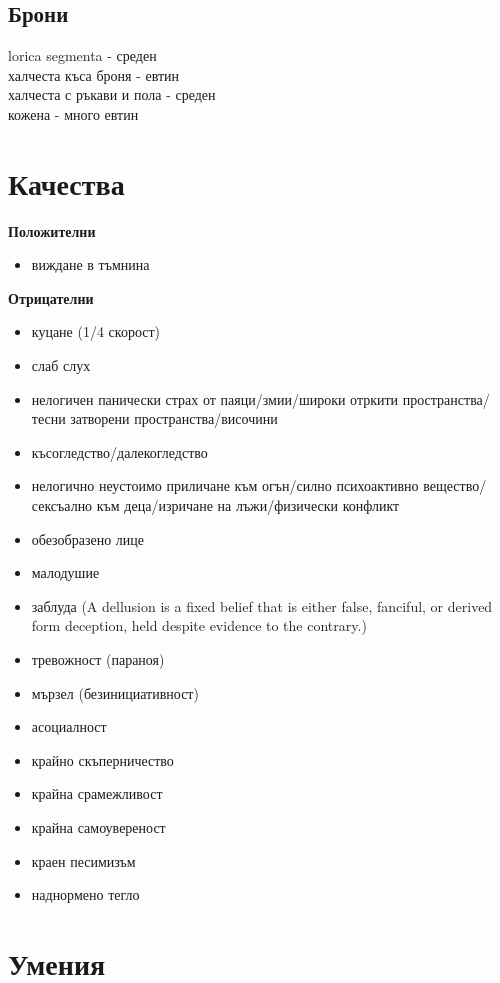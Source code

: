 \subsection{Брони}
lorica segmenta - среден  \\
халчеста къса броня - евтин \\
халчеста с ръкави и пола - среден \\
кожена - много евтин

\section{Качества}

\textbf{Положителни}
\begin{itemize}
\item{виждане в тъмнина}
\end{itemize}

\vspace{0.7cm}
\textbf{Отрицателни}
\begin{itemize}
\item{куцане (1/4 скорост)}
\item{слаб слух}
\item{нелогичен панически страх от паяци/змии/широки отркити пространства/тесни затворени пространства/височини}
\item{късогледство/далекогледство}
\item{нелогично неустоимо приличане към огън/силно психоактивно вещество/сексъално към деца/изричане на лъжи/физически конфликт}
\item{обезобразено лице}
\item{малодушие}
\item{заблуда (A dellusion is a fixed belief that is either false, fanciful, or derived form deception, held despite evidence to the contrary.)}
\item{тревожност (параноя)}
\item{мързел (безинициативност)}
\item{асоциалност}
\item{крайно скъперничество}
\item{крайна срамежливост}
\item{крайна самоувереност}
\item{краен песимизъм}
\item{наднормено тегло}
\end{itemize}

\section{Умения}
